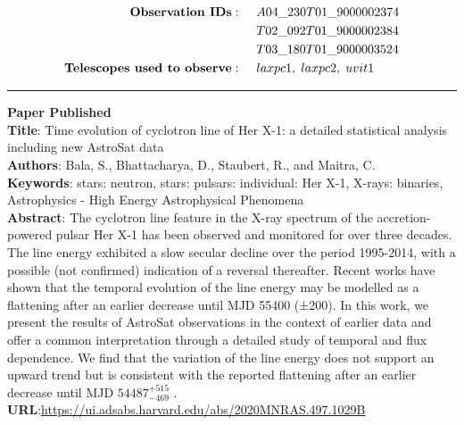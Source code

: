 \documentclass[12pt, A4]{article}
\begin{document}
\begin{titlepage}
\begin{normalsize}
\begin{align*}
        \textbf{Observation IDs}: \hspace{0.5cm} &A04\_230T01\_9000002374\\
        &T02\_092T01\_9000002384\\ &T03\_180T01\_9000003524\\
        \textbf{Telescopes used to observe}:\hspace{0.5cm} &laxpc1, \hspace{0.1cm}laxpc2,\hspace{0.1cm} uvit1\\
    \end{align*}
    \end{normalsize}
    \rule{\textwidth}{0.8pt}
    \end{titlepage}

    \break
    
    \noindent\LARGE\textbf{Paper Published}\\[1cm]
    {\large \textbf{Title}:	Time evolution of cyclotron line of Her X-1: a detailed                                 statistical analysis including new AstroSat data\\
    \textbf{Authors}: Bala, S., Bhattacharya, D., Staubert, R., and Maitra, C.\\
    \textbf{Keywords}:	stars: neutron, stars: pulsars: individual: Her X-1, X-rays: binaries, Astrophysics - High Energy Astrophysical Phenomena\\
    \textbf{Abstract}:	The cyclotron line feature in the X-ray spectrum of the accretion-powered pulsar Her X-1 has been observed and monitored for over three decades. The line energy exhibited a slow secular decline over the period 1995-2014, with a possible (not confirmed) indication of a reversal thereafter. Recent works have shown that the temporal evolution of the line energy may be modelled as a flattening after an earlier decrease until MJD 55400 (±200). In this work, we present the results of AstroSat observations in the context of earlier data and offer a common interpretation through a detailed study of temporal and flux dependence. We find that the variation of the line energy does not support an upward trend but is consistent with the reported flattening after an earlier decrease until MJD $54487^{+515}_{-469}$ .\\
    \textbf{URL}:\hspace{0.2cm}\url{https://ui.adsabs.harvard.edu/abs/2020MNRAS.497.1029B}
    }
\end{document}
